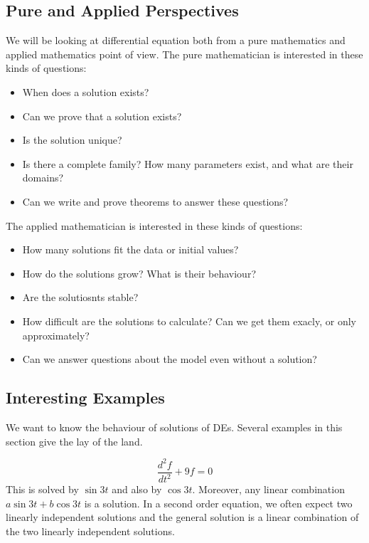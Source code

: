 \documentclass[fleqn,letterpaper]{report}
\begin{document}
\subsection{Pure and Applied Perspectives}
\label{pure-and-applied}

We will be looking at differential equation both from a pure
mathematics and applied mathematics point of view. The pure
mathematician is interested in these kinds of questions:

\begin{itemize}
\item When does a solution exists?
\item Can we prove that a solution exists?
\item Is the solution unique?
\item Is there a complete family? How many parameters exist, and 
what are their domains?
\item Can we write and prove theorems to answer these questions?
\end{itemize}

The applied mathematician is interested in these kinds of
questions:

\begin{itemize}
\item How many solutions fit the data or initial values?
\item How do the solutions grow? What is their behaviour?
\item Are the solutiosnts stable?
\item How difficult are the solutions to calculate? Can we get
them exacly, or only approximately?
\item Can we answer questions about the model even without a
solution?
\end{itemize}

\subsection{Interesting Examples}
\label{interesting-examples}

We want to know the behaviour of solutions of DEs. Several
examples in this section give the lay of the land.

\begin{example}
\begin{equation*}
\frac{d^2f}{dt^2} + 9 f = 0
\end{equation*}
This is solved by $\sin 3t$ and also by $\cos 3t$. Moreover, any
linear combination $a\sin 3t + b \cos 3t$ is a solution. 
In a second order equation, we often expect two linearly
independent solutions and the general solution is a linear
combination of the two linearly independent solutions.
\end{example}
\end{document}
